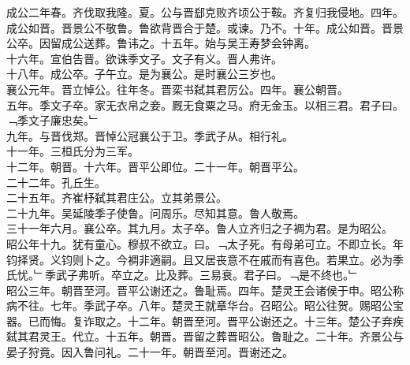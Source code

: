 \documentclass{zhvt-classic}
\begin{document}
\hspace*{2em}成公二年春。齐伐取我隆。夏。公与晋郄克败齐顷公于鞍。齐复归我侵地。四年。成公如晋。晋景公不敬鲁。鲁欲背晋合于楚。或谏。乃不。十年。成公如晋。晋景公卒。因留成公送葬。鲁讳之。十五年。始与吴王寿梦会钟离。\\
\hspace*{2em}十六年。宣伯告晋。欲诛季文子。文子有义。晋人弗许。\\
\hspace*{2em}十八年。成公卒。子午立。是为襄公。是时襄公三岁也。\\
\hspace*{2em}襄公元年。晋立悼公。往年冬。晋栾书弑其君厉公。四年。襄公朝晋。\\
\hspace*{2em}五年。季文子卒。家无衣帛之妾。厩无食粟之马。府无金玉。以相三君。君子曰。﹁季文子廉忠矣。﹂\\
\hspace*{2em}九年。与晋伐郑。晋悼公冠襄公于卫。季武子从。相行礼。\\
\hspace*{2em}十一年。三桓氏分为三军。\\
\hspace*{2em}十二年。朝晋。十六年。晋平公即位。二十一年。朝晋平公。\\
\hspace*{2em}二十二年。孔丘生。\\
\hspace*{2em}二十五年。齐崔杼弑其君庄公。立其弟景公。\\
\hspace*{2em}二十九年。吴延陵季子使鲁。问周乐。尽知其意。鲁人敬焉。\\
\hspace*{2em}三十一年六月。襄公卒。其九月。太子卒。鲁人立齐归之子裯为君。是为昭公。\\
\hspace*{2em}昭公年十九。犹有童心。穆叔不欲立。曰。﹁太子死。有母弟可立。不即立长。年钧择贤。义钧则卜之。今裯非適嗣。且又居丧意不在戚而有喜色。若果立。必为季氏忧。﹂季武子弗听。卒立之。比及葬。三易衰。君子曰。﹁是不终也。﹂\\
\hspace*{2em}昭公三年。朝晋至河。晋平公谢还之。鲁耻焉。四年。楚灵王会诸侯于申。昭公称病不往。七年。季武子卒。八年。楚灵王就章华台。召昭公。昭公往贺。赐昭公宝器。已而悔。复诈取之。十二年。朝晋至河。晋平公谢还之。十三年。楚公子弃疾弑其君灵王。代立。十五年。朝晋。晋留之葬晋昭公。鲁耻之。二十年。齐景公与晏子狩竟。因入鲁问礼。二十一年。朝晋至河。晋谢还之。\\
\end{document}
